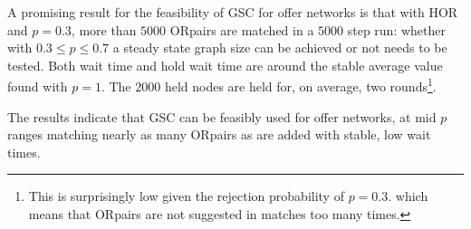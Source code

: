 \documentclass[main.tex]{subfiles}
\begin{document}
A promising result for the feasibility of GSC for offer networks is that with HOR and $p=0.3$, more than $5000$ ORpairs are matched in a $5000$ step run: whether with $0.3 \leq p \leq 0.7$ a steady state graph size can be achieved or not needs to be tested. Both wait time and hold wait time are around the stable average value found with $p=1$. The $2000$ held nodes are held for, on average, two rounds\footnote{This is surprisingly low given the rejection probability of $p = 0.3$. which means that ORpairs are not suggested in matches too many times.}.

The results indicate that GSC can be feasibly used for offer networks, at mid $p$ ranges matching nearly as many ORpairs as are added with stable, low wait times.
\end{document}

